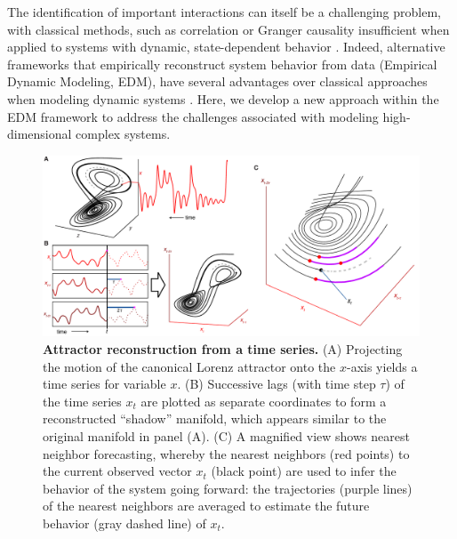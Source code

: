 The identification of important interactions can itself be a challenging problem, with classical methods, such as correlation or Granger causality \cite{Granger_1969} insufficient when applied to systems with dynamic, state-dependent behavior \cite{Sugihara_2012}. Indeed, alternative frameworks that empirically reconstruct system behavior from data (Empirical Dynamic Modeling, EDM), have several advantages over classical approaches when modeling dynamic systems \cite{Perretti_2013, Deyle_2013, Ye_2015}. Here, we develop a new approach within the EDM framework to address the challenges associated with modeling high-dimensional complex systems.

\begin{figure}[!ht]
\begin{center}\includegraphics[width=\textwidth]{fig_multiembed_1.pdf}\end{center}
\caption[Attractor reconstruction from a time series.]{\textbf{Attractor reconstruction from a time series.}\newline
(A) Projecting the motion of the canonical Lorenz attractor onto the $x$-axis yields a time series for variable $x$. (B) Successive lags (with time step $\tau$) of the time series $x_t$ are plotted as separate coordinates to form a reconstructed ``shadow'' manifold, which appears similar to the original manifold in panel (A). (C) A magnified view shows nearest neighbor forecasting, whereby the nearest neighbors (red points) to the current observed vector $x_t$ (black point) are used to infer the behavior of the system going forward: the trajectories (purple lines) of the nearest neighbors are averaged to estimate the future behavior (gray dashed line) of $x_t$.}
\label{fig_multiembed_attractor_reconstruction}
\end{figure}

